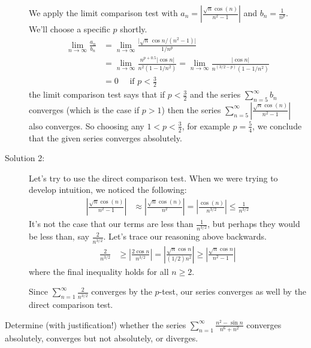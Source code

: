 \begin{solution}
\begin{description}
We  apply the limit comparison test with  $a_n=\left| \frac{\sqrt{n}\cos(n)}{n^2-1}\right|$
and  $b_n=\frac{1}{n^p}$. We'll choose a specific $p$ shortly.
\begin{align*}
\lim_{n\to\infty} \frac{a_n}{b_n}
&=\lim_{n\to\infty} \frac{\big|\sqrt n\,\cos n/(n^2-1)\big|}{1/n^p} \\
&=\lim_{n\to\infty} \frac{n^{p+0.5}|\cos n|}
                                   {n^2(1-1/n^2)}
= \lim_{n\to\infty} \frac{|\cos n|}{n^{(3/2-p)}(1-1/n^2)} \\
&=0\quad\text{ if $p<\frac{3}{2}$}
\end{align*}
the limit comparison test says that if $p<\frac{3}{2}$ and the series
$\sum\limits_{n=5}^\infty b_n$ converges (which is the case if $p>1$) then the series
$\sum\limits_{n=5}^\infty  \left|\frac{\sqrt{n}\cos(n)}{n^2-1}\right|$ also converges.
So choosing any $1<p<\frac{3}{2}$, for example $p=\frac{5}{4}$, we conclude that
the given series converges absolutely.

\item[Solution 2:]
Let's try to use the direct comparison test. When we were trying to develop intuition, we noticed the following:
\begin{align*}
\left|\frac{\sqrt{n}\cos(n)}{n^2-1}\right|
&\approx \left|\frac{\sqrt{n}\cos(n)}{n^2}\right|
= \left|\frac{\cos(n)}{n^{3/2}}\right|
\le \frac{1}{n^{3/2}}
\end{align*}
It's not the case that our terms are less than $\frac{1}{n^{3/2}}$, but perhaps they would be less than, say $\frac{2}{n^{3/2}}$. Let's trace our reasoning above backwards.
\begin{align*}
\frac{2}{n^{3/2}} &\geq \left|\frac{2\cos n}{n^{3/2}}\right|
=\left|\frac{\sqrt{n}\cos n}{(1/2)n^{2}}\right|
\geq \left|\frac{\sqrt{n}\cos n}{n^{2}-1}\right|
\end{align*}
where the final inequality holds for all $n \ge 2$.

Since $\sum\limits_{n=1}^\infty \frac{2}{n^{3/2}}$ converges by the $p$-test, our series  converges as well by the direct comparison test.
\end{description}
\end{solution}


\begin{Mquestion}[2012A]
Determine (with justification!) whether the series
$\displaystyle\sum_{n=1}^\infty\frac{n^2-\sin n}{n^6+n^2}$
converges absolutely, converges but not absolutely, or diverges.
\end{Mquestion}

